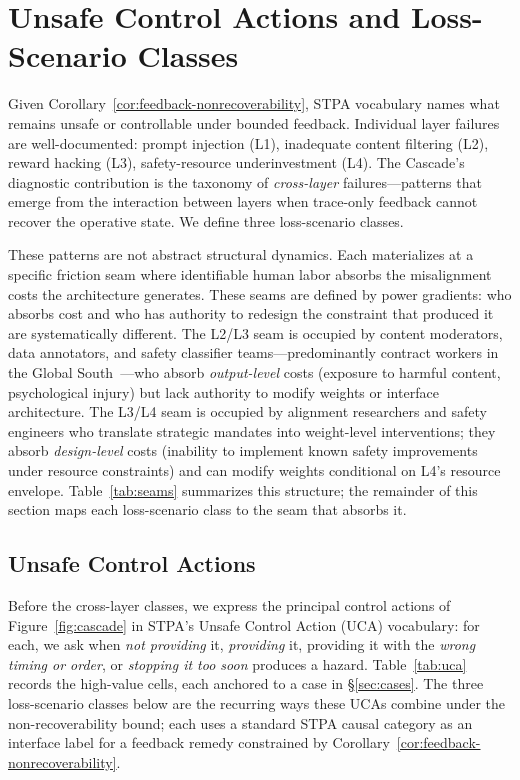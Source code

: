\section{Unsafe Control Actions and Loss-Scenario Classes}\label{sec:patterns}

Given Corollary~\ref{cor:feedback-nonrecoverability}, STPA vocabulary names what remains unsafe or controllable under bounded feedback. Individual layer failures are well-documented: prompt injection (L1), inadequate content filtering (L2), reward hacking (L3), safety-resource underinvestment (L4). The Cascade's diagnostic contribution is the taxonomy of \textit{cross-layer} failures---patterns that emerge from the interaction between layers when trace-only feedback cannot recover the operative state. We define three loss-scenario classes.

These patterns are not abstract structural dynamics. Each materializes at a specific friction seam where identifiable human labor absorbs the misalignment costs the architecture generates. These seams are defined by power gradients: who absorbs cost and who has authority to redesign the constraint that produced it are systematically different. The L2/L3 seam is occupied by content moderators, data annotators, and safety classifier teams---predominantly contract workers in the Global South~\cite{cnn2024moderators, equidem2025ihrb}---who absorb \textit{output-level} costs (exposure to harmful content, psychological injury) but lack authority to modify weights or interface architecture. The L3/L4 seam is occupied by alignment researchers and safety engineers who translate strategic mandates into weight-level interventions; they absorb \textit{design-level} costs (inability to implement known safety improvements under resource constraints) and can modify weights conditional on L4's resource envelope. Table~\ref{tab:seams} summarizes this structure; the remainder of this section maps each loss-scenario class to the seam that absorbs it.

\subsection{Unsafe Control Actions}\label{sec:uca}

Before the cross-layer classes, we express the principal control actions of Figure~\ref{fig:cascade} in STPA's Unsafe Control Action (UCA) vocabulary: for each, we ask when \emph{not providing} it, \emph{providing} it, providing it with the \emph{wrong timing or order}, or \emph{stopping it too soon} produces a hazard. Table~\ref{tab:uca} records the high-value cells, each anchored to a case in \S\ref{sec:cases}. The three loss-scenario classes below are the recurring ways these UCAs combine under the non-recoverability bound; each uses a standard STPA causal category as an interface label for a feedback remedy constrained by Corollary~\ref{cor:feedback-nonrecoverability}.

